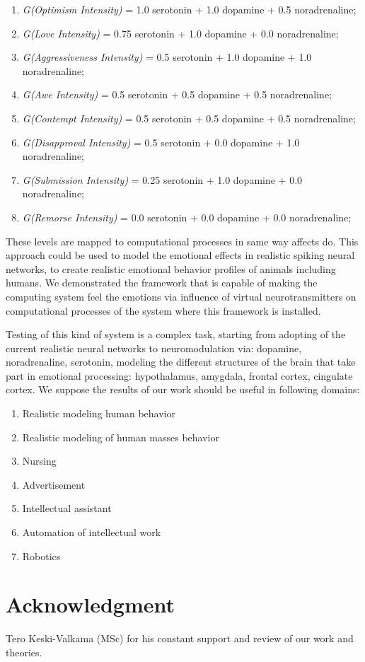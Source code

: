 \begin{enumerate}
 \item  \emph{G(Optimism Intensity)} = 1.0 serotonin  + 1.0 dopamine + 0.5 noradrenaline;
 \item  \emph{G(Love Intensity)} = 0.75 serotonin + 1.0 dopamine + 0.0 noradrenaline;
 \item  \emph{G(Aggressiveness Intensity)} = 0.5 serotonin + 1.0 dopamine + 1.0 noradrenaline;
 \item  \emph{G(Awe Intensity)} = 0.5 serotonin + 0.5 dopamine + 0.5 noradrenaline;
 \item  \emph{G(Contempt Intensity)} = 0.5 serotonin + 0.5 dopamine + 0.5 noradrenaline;
 \item  \emph{G(Disapproval Intensity)} = 0.5 serotonin + 0.0 dopamine + 1.0 noradrenaline;
 \item  \emph{G(Submission Intensity)} = 0.25 serotonin + 1.0 dopamine + 0.0 noradrenaline;
 \item  \emph{G(Remorse Intensity)} = 0.0 serotonin + 0.0 dopamine + 0.0 noradrenaline;
\end{enumerate}

These levels are mapped to computational processes in same way affects do.
This approach could be used to model the emotional effects in realistic spiking neural networks, to create realistic emotional behavior profiles of animals including humans.
We demonstrated the framework that is capable of making the computing system feel the emotions via influence of virtual neurotransmitters on computational processes of the system where this framework is installed.

Testing of this kind of system is a complex task, starting from adopting of the current realistic neural networks to neuromodulation via: dopamine, noradrenaline, serotonin, modeling the different structures of the brain that take part in emotional processing: hypothalamus, amygdala, frontal cortex, cingulate cortex.
We suppose the results of our work should be useful in following domains:

\begin{enumerate}
 \item  Realistic modeling human behavior
 \item  Realistic modeling of human masses behavior
 \item  Nursing
 \item  Advertisement
 \item  Intellectual assistant
 \item  Automation of intellectual work
 \item  Robotics
\end{enumerate}

\section{Acknowledgment}

Tero Keski-Valkama (MSc) for his constant support and review of our work and theories.


